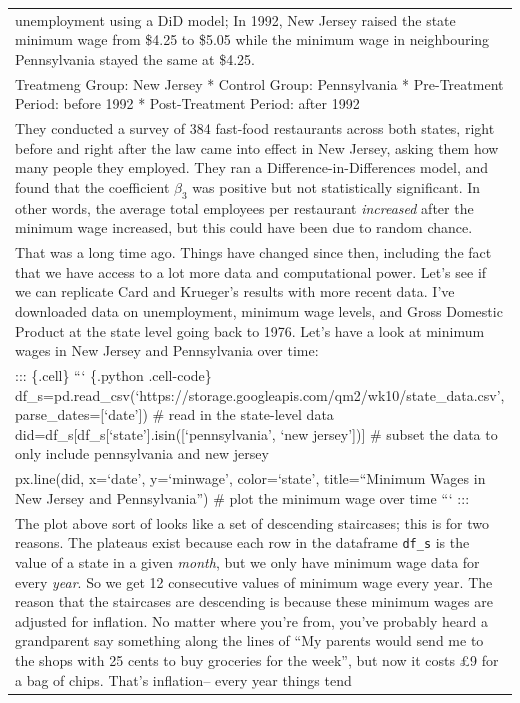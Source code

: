 \documentclass[
  letterpaper,
  DIV=11,
  numbers=noendperiod]{scrreprt}
\begin{document}
\begin{longtable}[]{@{}
  >{\raggedright\arraybackslash}p{}@{}}
unemployment using a DiD model; In 1992, New Jersey raised the state
minimum wage from \$4.25 to \$5.05 while the minimum wage in
neighbouring Pennsylvania stayed the same at \$4.25. \\
* Treatmeng Group: New Jersey * Control Group: Pennsylvania *
Pre-Treatment Period: before 1992 * Post-Treatment Period: after 1992 \\
They conducted a survey of 384 fast-food restaurants across both states,
right before and right after the law came into effect in New Jersey,
asking them how many people they employed. They ran a
Difference-in-Differences model, and found that the coefficient
\(\beta_3\) was positive but not statistically significant. In other
words, the average total employees per restaurant \emph{increased} after
the minimum wage increased, but this could have been due to random
chance. \\
That was a long time ago. Things have changed since then, including the
fact that we have access to a lot more data and computational power.
Let's see if we can replicate Card and Krueger's results with more
recent data. I've downloaded data on unemployment, minimum wage levels,
and Gross Domestic Product at the state level going back to 1976. Let's
have a look at minimum wages in New Jersey and Pennsylvania over
time: \\
::: \{.cell\} ``` \{.python .cell-code\}
df\_s=pd.read\_csv(`https://storage.googleapis.com/qm2/wk10/state\_data.csv',
parse\_dates={[}`date'{]}) \# read in the state-level data
did=df\_s{[}df\_s{[}`state'{]}.isin({[}`pennsylvania', `new
jersey'{]}){]} \# subset the data to only include pennsylvania and new
jersey \\
px.line(did, x=`date', y=`minwage', color=`state', title=``Minimum Wages
in New Jersey and Pennsylvania'') \# plot the minimum wage over time ```
::: \\
The plot above sort of looks like a set of descending staircases; this
is for two reasons. The plateaus exist because each row in the dataframe
\texttt{df\_s} is the value of a state in a given \emph{month}, but we
only have minimum wage data for every \emph{year}. So we get 12
consecutive values of minimum wage every year. The reason that the
staircases are descending is because these minimum wages are adjusted
for inflation. No matter where you're from, you've probably heard a
grandparent say something along the lines of ``My parents would send me
to the shops with 25 cents to buy groceries for the week'', but now it
costs £9 for a bag of chips. That's inflation-- every year things tend

\end{longtable}
\end{document}
